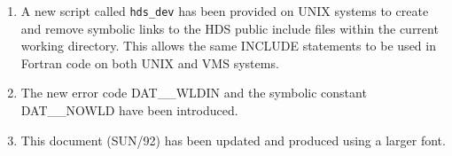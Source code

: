\begin{enumerate}
\item
A new script called {\tt hds\_dev} has been provided on UNIX systems to create
and remove symbolic links to the HDS public include files within the current
working directory. This allows the same INCLUDE statements to be used in Fortran
code on both UNIX and VMS systems.

\item
The new error code DAT\_\_WLDIN and the symbolic constant DAT\_\_NOWLD have been
introduced.

\item
This document (SUN/92) has been updated and produced using a larger font.

\end{enumerate}


